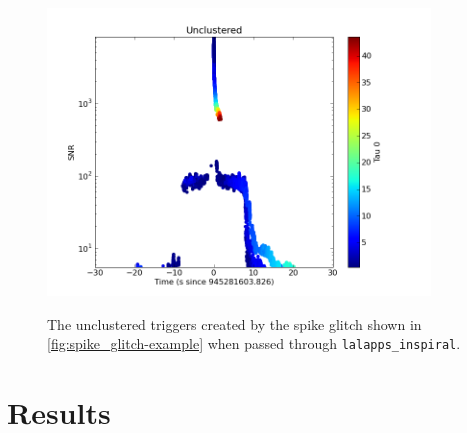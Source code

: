 \begin{figure}[hp]
\includegraphics[width=4in]{figures/spike_glitch/L1_945281603.png}
\label{fig:spike_glitch-cbc_response}
\caption{The unclustered triggers created by the spike glitch shown in \ref{fig:spike_glitch-example} when passed through \texttt{lalapps\_inspiral}.}
\end{figure}

%

\section{Results}

